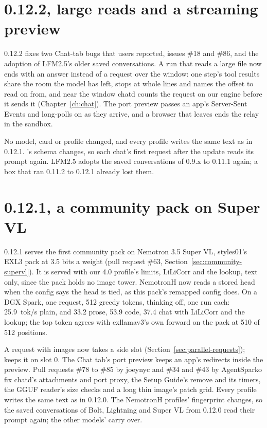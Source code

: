 \section{0.12.2, large reads and a streaming preview}\label{sec:changelog-0122}

0.12.2 fixes two Chat-tab bugs that users reported, issues \#18 and \#86, and the adoption of LFM2.5's older saved conversations. A run that reads a large file now ends with an answer instead of a request over the window: one step's tool results share the room the model has left,  stops at whole lines and names the offset to read on from, and near the window chatd counts the request on our engine before it sends it (Chapter~\ref{ch:chat}). The port preview passes an app's Server-Sent Events and long-polls on as they arrive, and a browser that leaves ends the relay in the sandbox.

No model, card or profile changed, and every profile writes the same text as in 0.12.1. 's schema changes, so each chat's first request after the update reads its prompt again. LFM2.5 adopts the saved conversations of 0.9.x to 0.11.1 again; a box that ran 0.11.2 to 0.12.1 already lost them.

\section{0.12.1, a community pack on Super VL}\label{sec:changelog-0121}

0.12.1 serves the first community pack on Nemotron 3.5 Super VL, styles01's EXL3 pack at 3.5 bits a weight (pull request \#63, Section~\ref{sec:community-supervl}). It is served with our 4.0 profile's limits, LiLiCorr and the lookup, text only, since the pack holds no image tower. NemotronH now reads a stored head when the config says the head is tied, as this pack's remapped config does. On a DGX Spark, one request, 512 greedy tokens, thinking off, one run each: 25.9~tok/s plain, and 33.2 prose, 53.9 code, 37.4 chat with LiLiCorr and the lookup; the top token agrees with exllamav3's own forward on the pack at 510 of 512 positions.

A request with images now takes a side slot (Section~\ref{sec:parallel-requests});  keeps it on slot 0. The Chat tab's port preview keeps an app's redirects inside the preview. Pull requests \#78 to \#85 by joeynyc and \#34 and \#43 by AgentSparko fix chatd's attachments and port proxy, the Setup Guide's remove and its timers, the GGUF reader's size checks and a long thin image's patch grid. Every profile writes the same text as in 0.12.0. The NemotronH profiles' fingerprint changes, so the saved conversations of Bolt, Lightning and Super VL from 0.12.0 read their prompt again; the other models' carry over.

